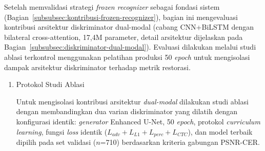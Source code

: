 \documentclass[12pt,a4paper]{article}
\begin{document}
Setelah memvalidasi strategi \textit{frozen recognizer} sebagai fondasi sistem (Bagian~\ref{subsubsec:kontribusi-frozen-recognizer}), bagian ini mengevaluasi kontribusi arsitektur diskriminator dual-modal (cabang CNN+BiLSTM dengan bilateral cross-attention, 17,4M parameter, detail arsitektur dijelaskan pada Bagian~\ref{subsubsec:diskriminator-dual-modal}). Evaluasi dilakukan melalui studi ablasi terkontrol menggunakan pelatihan produksi 50 \textit{epoch} untuk mengisolasi dampak arsitektur diskriminator terhadap metrik restorasi.



\begin{enumerate}[leftmargin=1.5em, labelsep=0.5em, itemindent=0pt, noitemsep, topsep=0pt]
    \item Protokol Studi Ablasi

          Untuk mengisolasi kontribusi arsitektur \textit{dual-modal} dilakukan studi ablasi dengan membandingkan dua varian diskriminator yang dilatih dengan konfigurasi identik: \textit{generator} Enhanced U-Net, 50 \textit{epoch}, protokol \textit{curriculum learning}, fungsi \textit{loss} identik ($L_{adv} + L_{L1} + L_{perc} + L_{CTC}$), dan model terbaik dipilih pada set validasi ($n$=710) berdasarkan kriteria gabungan PSNR-CER.


\end{enumerate}
\end{document}
